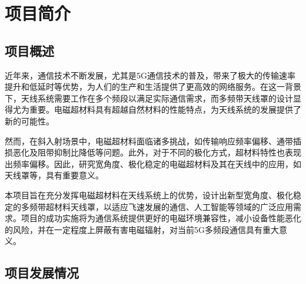 \section{项目简介}
\label{sec:introduction}
\FloatBarrier %

\subsection{项目概述}
近年来，通信技术不断发展，尤其是5G通信技术的普及，带来了极大的传输速率提升和低延时等优势，为人们的生产和生活提供了更高效的网络服务。在这一背景下，天线系统需要工作在多个频段以满足实际通信需求，而多频带天线罩的设计显得尤为重要。电磁超材料具有超越自然材料的性能特点，为天线系统的发展提供了新的可能性。

然而，在斜入射场景中，电磁超材料面临诸多挑战，如传输响应频率偏移、通带插损恶化及阻带抑制比降低等问题。此外，对于不同的极化方式，超材料特性也表现出频率偏移。因此，研究宽角度、极化稳定的电磁超材料及其在天线中的应用，如天线罩等，具有重要意义。

本项目旨在充分发挥电磁超材料在天线系统上的优势，设计出新型宽角度、极化稳定的多频带超材料天线罩，以适应飞速发展的通信、人工智能等领域的广泛应用需求。项目的成功实施将为通信系统提供更好的电磁环境兼容性，减小设备性能恶化的风险，并在一定程度上屏蔽有害电磁辐射，对当前5G多频段通信具有重大意义。

\subsection{项目发展情况}

